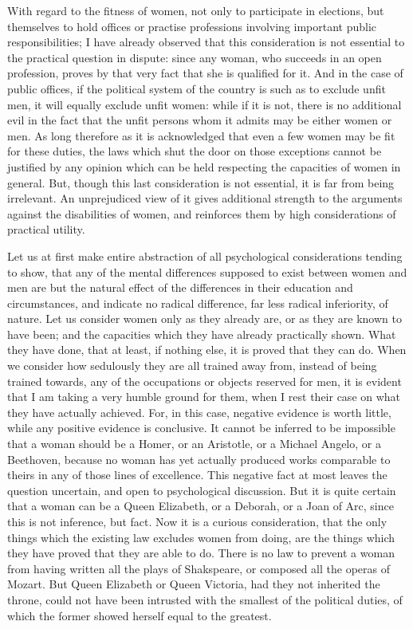 \documentclass[12pt]{report}
\begin{document}
With regard to the fitness of women, not only to participate in elections, but themselves to hold offices or practise professions involving important public responsibilities; I have already observed that this consideration is not essential to the practical question in dispute: since any woman, who succeeds in an open profession, proves by that very fact that she is qualified for it. And in the case of public offices, if the political system of the country is such as to exclude unfit men, it will equally exclude unfit women: while if it is not, there is no additional evil in the fact that the unfit persons whom it admits may be either women or men. As long therefore as it is acknowledged that even a few women may be fit for these duties, the laws which shut the door on those exceptions cannot be justified by any opinion which can be held respecting the capacities of women in general. But, though this last consideration is not essential, it is far from being irrelevant. An unprejudiced view of it gives additional strength to the arguments against the disabilities of women, and reinforces them by high considerations of practical utility.

Let us at first make entire abstraction of all psychological considerations tending to show, that any of the mental differences supposed to exist between women and men are but the natural effect of the differences in their education and circumstances, and indicate no radical difference, far less radical inferiority, of nature. Let us consider women only as they already are, or as they are known to have been; and the capacities which they have already practically shown. What they have done, that at least, if nothing else, it is proved that they can do. When we consider how sedulously they are all trained away from, instead of being trained towards, any of the occupations or objects reserved for men, it is evident that I am taking a very humble ground for them, when I rest their case on what they have actually achieved. For, in this case, negative evidence is worth little, while any positive evidence is conclusive. It cannot be inferred to be impossible that a woman should be a Homer, or an Aristotle, or a Michael Angelo, or a Beethoven, because no woman has yet actually produced works comparable to theirs in any of those lines of excellence. This negative fact at most leaves the question uncertain, and open to psychological discussion. But it is quite certain that a woman can be a Queen Elizabeth, or a Deborah, or a Joan of Arc, since this is not inference, but fact. Now it is a curious consideration, that the only things which the existing law excludes women from doing, are the things which they have proved that they are able to do. There is no law to prevent a woman from having written all the plays of Shakspeare, or composed all the operas of Mozart. But Queen Elizabeth or Queen Victoria, had they not inherited the throne, could not have been intrusted with the smallest of the political duties, of which the former showed herself equal to the greatest.
\end{document}
